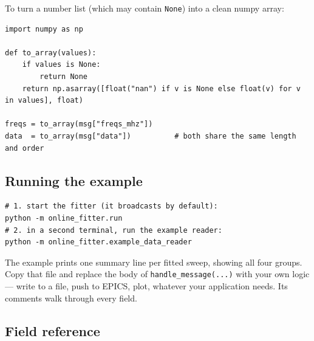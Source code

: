 \documentclass[11pt]{article}
\newcommand{\code}[1]{\lstinline[style=plain]|#1|}
\begin{document}
To turn a number list (which may contain \code{None}) into a clean numpy array:

\begin{lstlisting}
import numpy as np

def to_array(values):
    if values is None:
        return None
    return np.asarray([float("nan") if v is None else float(v) for v in values], float)

freqs = to_array(msg["freqs_mhz"])
data  = to_array(msg["data"])          # both share the same length and order
\end{lstlisting}

\subsection{Running the example}

\begin{lstlisting}[style=plain]
# 1. start the fitter (it broadcasts by default):
python -m online_fitter.run
# 2. in a second terminal, run the example reader:
python -m online_fitter.example_data_reader
\end{lstlisting}

The example prints one summary line per fitted sweep, showing all four groups. Copy that file
and replace the body of \code{handle_message(...)} with your own logic --- write to a file,
push to EPICS, plot, whatever your application needs. Its comments walk through every field.

\subsection{Field reference}
\end{document}
